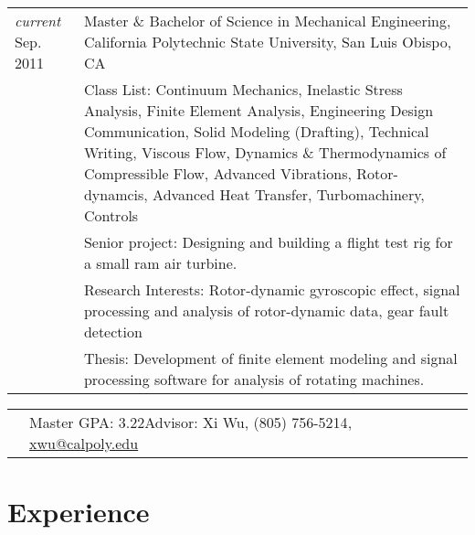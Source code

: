 \documentclass[10pt]{article} %
\newcommand{\secspace}{.25em}
\begin{document}
\begin{tabular}{p{.6in}|p{5.5in}}	
	\emph{current} Sep. 2011 & Master \& Bachelor of Science in Mechanical Engineering,  California Polytechnic State University, San Luis Obispo, CA\\
	& \footnotesize{Class List: Continuum Mechanics, Inelastic Stress Analysis, Finite Element Analysis, Engineering Design Communication, Solid Modeling (Drafting), Technical Writing, Viscous Flow, Dynamics \& Thermodynamics of Compressible Flow, Advanced Vibrations, Rotor-dynamcis, Advanced Heat Transfer, Turbomachinery, Controls}\\
	& \footnotesize{Senior project: Designing and building a flight test rig for a small ram air turbine.}\\
	& \footnotesize{Research Interests: Rotor-dynamic gyroscopic effect, signal processing and analysis of rotor-dynamic data, gear fault detection}\\
	& \footnotesize{Thesis: Development of finite element modeling and signal processing software for analysis of rotating machines.}\\
\end{tabular}\par \vspace{-.5em}
\begin{tabular}{p{.6in}p{5.5in}}	
	&\footnotesize{Master GPA: 3.22\hfill  Advisor: Xi Wu, (805) 756-5214}, \href{mailto:xwu@calpoly.edu}{xwu@calpoly.edu}\\[\secspace]
\end{tabular}



\section{Experience}
\end{document}
